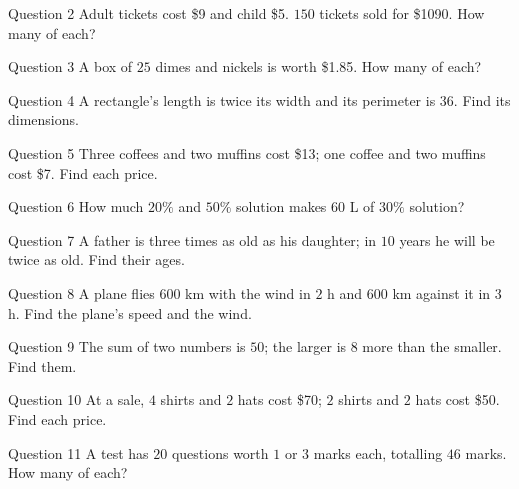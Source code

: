 \documentclass[11pt]{article}
\begin{document}
\begin{qbox}{Question 2}
Adult tickets cost \$9 and child \$5. $150$ tickets sold for \$1090. How many of each?\workspace{2.8cm}
\end{qbox}

\begin{qbox}{Question 3}
A box of $25$ dimes and nickels is worth \$1.85. How many of each?\workspace{2.8cm}
\end{qbox}

\begin{qbox}{Question 4}
A rectangle's length is twice its width and its perimeter is $36$. Find its dimensions.\workspace{2.6cm}
\end{qbox}

\begin{qbox}{Question 5}
Three coffees and two muffins cost \$13; one coffee and two muffins cost \$7. Find each price.\workspace{2.8cm}
\end{qbox}

\begin{qbox}{Question 6}
How much $20\%$ and $50\%$ solution makes $60$ L of $30\%$ solution?\workspace{3.0cm}
\end{qbox}

\begin{qbox}{Question 7}
A father is three times as old as his daughter; in $10$ years he will be twice as old. Find their ages.\workspace{2.8cm}
\end{qbox}

\begin{qbox}{Question 8}
A plane flies $600$ km with the wind in $2$ h and $600$ km against it in $3$ h. Find the plane's speed and the wind.\workspace{3.0cm}
\end{qbox}

\begin{qbox}{Question 9}
The sum of two numbers is $50$; the larger is $8$ more than the smaller. Find them.\workspace{2.4cm}
\end{qbox}

\begin{qbox}{Question 10}
At a sale, $4$ shirts and $2$ hats cost \$70; $2$ shirts and $2$ hats cost \$50. Find each price.\workspace{2.8cm}
\end{qbox}

\begin{qbox}{Question 11}
A test has $20$ questions worth $1$ or $3$ marks each, totalling $46$ marks. How many of each?\workspace{2.8cm}
\end{qbox}
\end{document}
